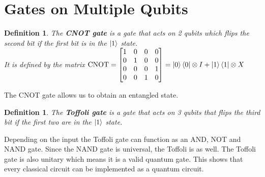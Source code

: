 \documentclass[12pt,twoside]{report}
\theoremstyle{thmstyle}
\newtheorem{defn}[subsection]{Definition}
\begin{document}
\section{Gates on Multiple Qubits}

\begin{defn}
    The \textbf{CNOT gate} is a gate that acts on 2 qubits which flips the second bit if the first bit is in the $\ket{1}$ state.\\
    It is defined by the matrix $\text{CNOT} = \begin{bmatrix} 1 & 0 & 0 & 0 \\ 0 & 1 & 0 & 0 \\ 0 & 0 & 0 & 1 \\ 0 & 0 & 1 & 0 \end{bmatrix} = \ket{0}\bra{0} \otimes I + \ket{1}\bra{1} \otimes X$
\end{defn}
The CNOT gate allows us to obtain an entangled state.

\begin{defn}
    The \textbf{Toffoli gate} is a gate that acts on 3 qubits that flips the third bit if the first two are in the $\ket{1}$ state.\\
\end{defn}

Depending on the input the Toffoli gate can function as an AND, NOT and NAND gate. Since the NAND gate is universal, the Toffoli is as well. The Toffoli gate is also unitary which means it is a valid quantum gate. This shows that every classical circuit can be implemented as a quantum circuit.

\newpage
{}
\begin{thebibliography}{9}
        \lipsum[1][1-3]
        \lipsum[2][1-3]
        \lipsum[3][1-3]
        \lipsum[4][1-3]
        \lipsum[5][1-3]
        \lipsum[6][1-3]
\end{thebibliography}
\end{document}
